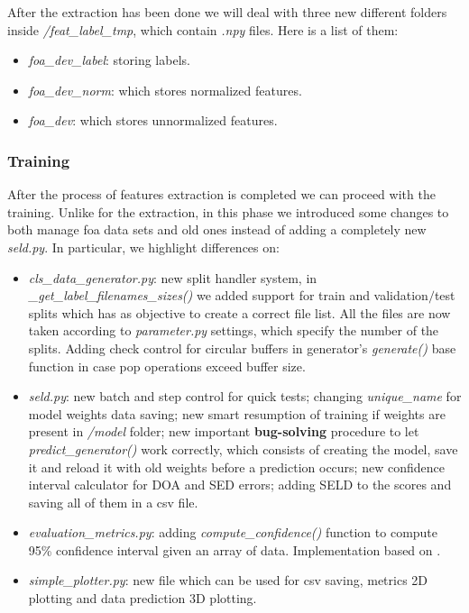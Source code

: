 \documentclass[11pt]{article}
\begin{document}
\noindent
After the extraction has been done we will deal with three new different folders inside \textit{/feat\_label\_tmp}, which contain \textit{.npy} files. Here is a list of them: 

\begin{itemize}
	\item \textit{foa\_dev\_label}: storing labels.
	\item \textit{foa\_dev\_norm}: which stores normalized features.
	\item \textit{foa\_dev}: which stores unnormalized features.
\end{itemize}



\subsubsection{Training}\label{minisec:train}

After the process of features extraction is completed we can proceed with the training. Unlike for the extraction, in this phase we introduced some changes to both manage foa data sets and old ones instead of adding a completely new \textit{seld.py}. In particular, we highlight differences on:

\begin{itemize}
	\item \textit{cls\_data\_generator.py}: new split handler system, in \textit{\_get\_label\_filenames\_sizes()} we added support for train and validation$/$test splits which has as objective to create a correct file list. All the files are now taken according to \textit{parameter.py} settings, which specify the number of the splits. Adding check control for circular buffers in generator's \textit{generate()} base function in case pop operations exceed buffer size. 
	\item \textit{seld.py}: new batch and step control for quick tests; changing \textit{unique\_name} for model weights data saving; new smart resumption of training if weights are present in \textit{/model} folder; new important \textbf{bug-solving} procedure to let \textit{predict\_generator()} work correctly, which consists of creating the model, save it and reload it with old weights before a prediction occurs; new confidence interval calculator for DOA and SED errors; adding SELD to the scores and saving all of them in a csv file.
	\item \textit{evaluation\_metrics.py}: adding \textit{compute\_confidence()} function to compute 95\% confidence interval given an array of data. Implementation based on \cite{confint}.
	\item \textit{simple\_plotter.py}: new file which can be used for csv saving, metrics 2D plotting and data prediction 3D plotting.
\end{itemize}
\end{document}
